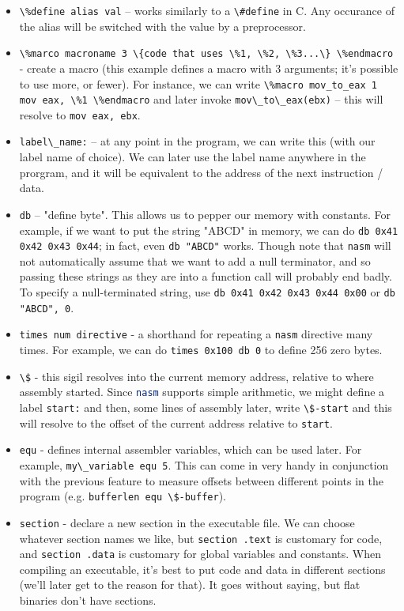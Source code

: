 \documentclass{article}
\newcommand{\xcode}[2]{\colorbox{ubuntuback}{\lstinline[language=#1]|#2|}}
\newcommand{\asm}[1]{\xcode{{[x86masm]assembler}}{#1}}
\begin{document}
\begin{itemize}
    \item \asm{\%define alias val} -- works similarly to a \xcode{C}{\#define} in C. Any occurance of the alias will be switched with the value by a preprocessor.
    \item \asm{\%marco macroname 3 \{code that uses \%1, \%2, \%3...\} \%endmacro} - create a macro (this example defines a macro with 3 arguments; it's possible to use more, or fewer). For instance, we can write \asm{\%macro mov_to_eax 1 mov eax, \%1 \%endmacro} and later invoke \asm{mov\_to\_eax(ebx)} -- this will resolve to \asm{mov eax, ebx}. 
    \item \asm{label\_name:} -- at any point in the program, we can write this (with our label name of choice). We can later use the label name anywhere in the prorgram, and it will be equivalent to the address of the next instruction / data. 
    \item \asm{db} -- "define byte". This allows us to pepper our memory with constants. For example, if we want to put the string "ABCD" in memory, we can do \asm{db 0x41 0x42 0x43 0x44}; in fact, even \asm{db "ABCD"} works. Though note that \xcode{C}{nasm} will not automatically assume that we want to add a null terminator, and so passing these strings as they are into a function call will probably end badly. To specify a null-terminated string, use  \asm{db 0x41 0x42 0x43 0x44 0x00} or \asm{db "ABCD", 0}.
    \item \asm{times num directive} - a shorthand for repeating a \xcode{C}{nasm} directive many times. For example, we can do \asm{times 0x100 db 0} to define 256 zero bytes.
    \item \asm{\$} - this sigil resolves into the current memory address, relative to where assembly started. Since \xcode{bash}{nasm} supports simple arithmetic, we might define a label \asm{start:} and then, some lines of assembly later, write \asm{\$-start} and this will resolve to the offset of the current address relative to \asm{start}.
    \item \asm{equ} - defines internal assembler variables, which can be used later. For example, \asm{my\_variable equ 5}. This can come in very handy in conjunction with the previous feature to measure offsets between different points in the program (e.g. \asm{bufferlen equ \$-buffer}).
    \item \asm{section} - declare a new section in the executable file. We can choose whatever section names we like, but \asm{section .text} is customary for code, and \asm{section .data} is customary for global variables and constants. When compiling an executable, it's best to put code and data in different sections (we'll later get to the reason for that). It goes without saying, but flat binaries don't have sections.
\end{itemize}
\end{document}

